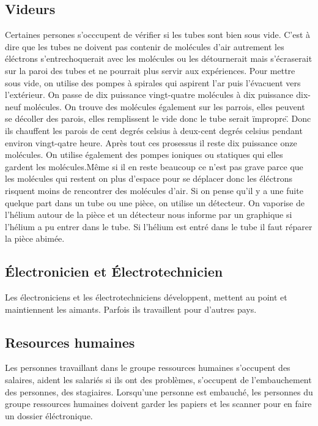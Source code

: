 		\subsection{Videurs}
			Certaines persones s'occcupent de vérifier si les tubes sont bien sous vide. C'est à dire que les tubes ne doivent pas contenir de molécules d'air autrement les éléctrons s'entrechoquerait avec les molécules ou les détournerait mais s'écraserait sur la paroi des tubes et ne pourrait plus servir aux expériences.
			Pour mettre sous vide, on utilise des pompes à spirales qui aspirent l'ar puis l'évacuent vers l'extérieur. On passe de dix puissance vingt-quatre molécules à dix puissance dix-neuf molécules. On trouve des molécules également sur les parrois, elles peuvent se décoller des parois, elles remplissent le vide donc le tube serait \"impropre\". Donc ils chauffent les parois de cent degrés celsius à deux-cent degrés celsius pendant environ vingt-qatre heure. Après tout ces prosessus il reste dix puissance onze molécules. On utilise également des pompes ioniques ou statiques qui elles gardent les molécules.Même si il en reste beaucoup ce n'est pas grave parce que les molécules qui restent on plus d'espace pour se déplacer donc les éléctrons risquent moins de rencontrer des molécules d'air. Si on pense qu'il y a une fuite quelque part dans un tube ou une pièce, on utilise un détecteur. On vaporise de l'hélium autour de la pièce et un détecteur nous informe par un graphique si l'hélium a pu entrer dans le tube. Si l'hélium est entré dans le tube il faut réparer la pièce abimée.  
		\subsection{Électronicien et Électrotechnicien}
			Les électroniciens et les électrotechniciens développent, mettent au point et maintiennent les aimants. Parfois ils travaillent pour d'autres pays.
		\subsection{Resources humaines}
			Les personnes travaillant dans le groupe ressources humaines s'occupent des salaires, aident les salariés si ils ont des problèmes, s'occupent de l'embauchement des personnes, des stagiaires. Lorsqu'une personne est embauché, les personnes du groupe ressources humaines doivent garder les papiers et les scanner pour en faire un dossier éléctronique. 


	
		
		
